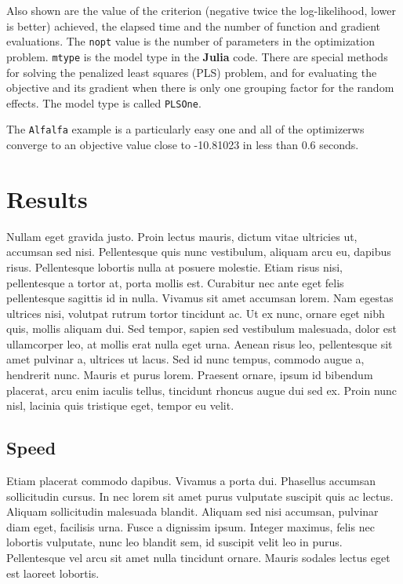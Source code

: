 \documentclass[article]{jss}
\begin{document}
Also shown are the value of the criterion (negative twice the
log-likelihood, lower is better) achieved, the elapsed time and the
number of function and gradient evaluations. The \texttt{nopt} value is
the number of parameters in the optimization problem. \texttt{mtype} is
the model type in the \textbf{Julia} code. There are special methods for
solving the penalized least squares (PLS) problem, and for evaluating
the objective and its gradient when there is only one grouping factor
for the random effects. The model type is called \texttt{PLSOne}.

The \texttt{Alfalfa} example is a particularly easy one and all of the
optimizerws converge to an objective value close to -10.81023 in less
than 0.6 seconds.

\section[Results]{Results}

Nullam eget gravida justo. Proin lectus mauris, dictum vitae ultricies ut, accumsan sed nisi. Pellentesque quis nunc vestibulum, aliquam arcu eu, dapibus risus. Pellentesque lobortis nulla at posuere molestie. Etiam risus nisi, pellentesque a tortor at, porta mollis est. Curabitur nec ante eget felis pellentesque sagittis id in nulla. Vivamus sit amet accumsan lorem. Nam egestas ultrices nisi, volutpat rutrum tortor tincidunt ac. Ut ex nunc, ornare eget nibh quis, mollis aliquam dui. Sed tempor, sapien sed vestibulum malesuada, dolor est ullamcorper leo, at mollis erat nulla eget urna. Aenean risus leo, pellentesque sit amet pulvinar a, ultrices ut lacus. Sed id nunc tempus, commodo augue a, hendrerit nunc. Mauris et purus lorem. Praesent ornare, ipsum id bibendum placerat, arcu enim iaculis tellus, tincidunt rhoncus augue dui sed ex. Proin nunc nisl, lacinia quis tristique eget, tempor eu velit. 

\subsection[Speed]{Speed}
 Etiam placerat commodo dapibus. Vivamus a porta dui. Phasellus accumsan sollicitudin cursus. In nec lorem sit amet purus vulputate suscipit quis ac lectus. Aliquam sollicitudin malesuada blandit. Aliquam sed nisi accumsan, pulvinar diam eget, facilisis urna. Fusce a dignissim ipsum. Integer maximus, felis nec lobortis vulputate, nunc leo blandit sem, id suscipit velit leo in purus. Pellentesque vel arcu sit amet nulla tincidunt ornare. Mauris sodales lectus eget est laoreet lobortis. 
\end{document}
